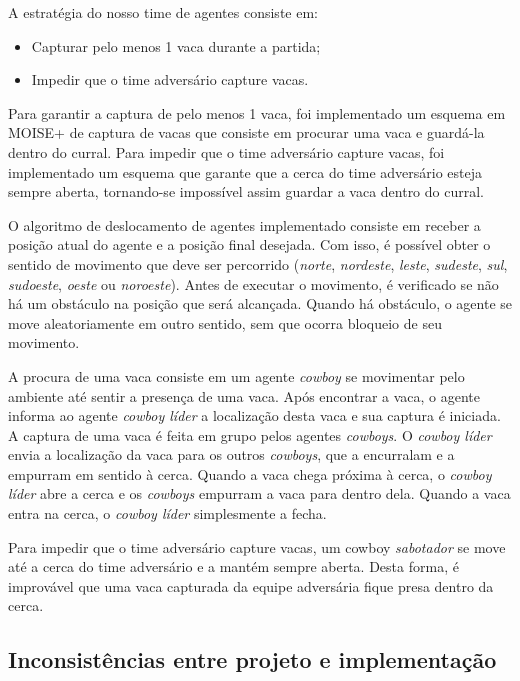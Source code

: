 \documentclass{llncs}
\begin{document}
A estratégia do nosso time de agentes consiste em:

\begin{itemize}
\item Capturar pelo menos 1 vaca durante a partida;
\item Impedir que o time adversário capture vacas.
\end{itemize}

Para garantir a captura de pelo menos 1 vaca, foi implementado um esquema em MOISE+ de captura de vacas que consiste em procurar uma vaca e guardá-la dentro do curral. Para impedir que o time adversário capture vacas, foi implementado um esquema que garante que a cerca do time adversário esteja sempre aberta, tornando-se impossível assim guardar a vaca dentro do curral.


O algoritmo de deslocamento de agentes implementado consiste em receber a posição atual do agente e a posição final desejada. Com isso, é possível obter o sentido de movimento que deve ser percorrido (\textit{norte}, \textit{nordeste}, \textit{leste}, \textit{sudeste}, \textit{sul}, \textit{sudoeste}, \textit{oeste} ou \textit{noroeste}). Antes de executar o movimento, é verificado se não há um obstáculo na posição que será alcançada. Quando há obstáculo, o agente se move aleatoriamente em outro sentido, sem que ocorra bloqueio de seu movimento.



A procura de uma vaca consiste em um agente \textit{cowboy} se movimentar pelo ambiente até sentir a presença de uma vaca. Após encontrar a vaca, o agente informa ao agente \textit{cowboy líder} a localização desta vaca e sua captura é iniciada. A captura de uma vaca é feita em grupo pelos agentes \textit{cowboys}. O \textit{cowboy líder} envia a localização da vaca para os outros \textit{cowboys}, que a encurralam e a empurram em sentido à cerca. Quando a vaca chega próxima à cerca, o \textit{cowboy líder} abre a cerca e os \textit{cowboys} empurram a vaca para dentro dela. Quando a vaca entra na cerca, o \textit{cowboy líder} simplesmente a fecha.

Para impedir que o time adversário capture vacas, um cowboy \textit{sabotador} se move até a cerca do time adversário e a mantém sempre aberta. Desta forma, é improvável que uma vaca capturada da equipe adversária fique presa dentro da cerca.

\subsection{Inconsistências entre projeto e implementação}
\end{document}
